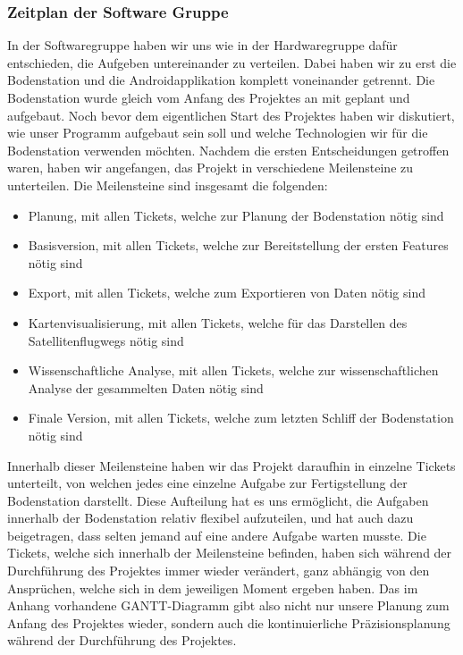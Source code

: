 \subsubsection{Zeitplan der Software Gruppe}
In der Softwaregruppe haben wir uns wie in der Hardwaregruppe dafür entschieden, die Aufgeben untereinander zu verteilen. Dabei haben wir zu erst die Bodenstation und die Androidapplikation komplett voneinander getrennt. Die Bodenstation wurde gleich vom Anfang des Projektes an mit geplant und aufgebaut. Noch bevor dem eigentlichen Start des Projektes haben wir diskutiert, wie unser Programm aufgebaut sein soll und welche Technologien wir für die Bodenstation verwenden möchten. Nachdem die ersten Entscheidungen getroffen waren, haben wir angefangen, das Projekt in verschiedene Meilensteine zu unterteilen. Die Meilensteine sind insgesamt die folgenden:
\begin{itemize}
    \item Planung, mit allen Tickets, welche zur Planung der Bodenstation nötig sind
    \item Basisversion, mit allen Tickets, welche zur Bereitstellung der ersten Features nötig sind
    \item Export, mit allen Tickets, welche zum Exportieren von Daten nötig sind
    \item Kartenvisualisierung, mit allen Tickets, welche für das Darstellen des Satellitenflugwegs nötig sind
    \item Wissenschaftliche Analyse, mit allen Tickets, welche zur wissenschaftlichen Analyse der gesammelten Daten nötig sind
    \item Finale Version, mit allen Tickets, welche zum letzten Schliff der Bodenstation nötig sind
\end{itemize}
Innerhalb dieser Meilensteine haben wir das Projekt daraufhin in einzelne Tickets unterteilt, von welchen jedes eine einzelne Aufgabe zur Fertigstellung der Bodenstation darstellt. Diese Aufteilung hat es uns ermöglicht, die Aufgaben innerhalb der Bodenstation relativ flexibel aufzuteilen, und hat auch dazu beigetragen, dass selten jemand auf eine andere Aufgabe warten musste. Die Tickets, welche sich innerhalb der Meilensteine befinden, haben sich während der Durchführung des Projektes immer wieder verändert, ganz abhängig von den Ansprüchen, welche sich in dem jeweiligen Moment ergeben haben. Das im Anhang vorhandene GANTT-Diagramm gibt also nicht nur unsere Planung zum Anfang des Projektes wieder, sondern auch die kontinuierliche Präzisionsplanung während der Durchführung des Projektes.


